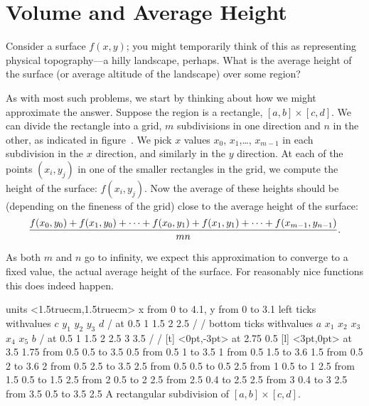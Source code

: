 \section{Volume and Average Height}{}{}

Consider a surface $f(x,y)$; you might temporarily think of this as
representing physical topography---a hilly landscape, perhaps. What is
the average height of the surface (or average
altitude of the landscape) over some region?

As with most such problems, we start by thinking about how we
might approximate the answer. Suppose the region is a rectangle,
$[a,b]\times[c,d]$. We can divide the rectangle into a grid, $m$
subdivisions in one direction and $n$ in the other, as indicated in
figure~. We pick $x$ values $x_0$,
$x_1$,\dots, $x_{m-1}$ in each subdivision in the $x$ direction, and
similarly in the $y$ direction.
At each of the points $(x_i,y_j)$ in one of the smaller rectangles in
the grid, we
compute the height of the surface: $f(x_i,y_j)$. Now the average
of these heights should be (depending on the fineness of the grid)
close to the average height of the surface:
$${f(x_0,y_0)+f(x_1,y_0)+\cdots+f(x_0,y_1)+f(x_1,y_1)+\cdots+
f(x_{m-1},y_{n-1})\over mn}.$$

As both $m$ and $n$ go to infinity, we expect this approximation to
converge to a fixed value, the actual average height of the
surface. For reasonably nice functions this does indeed happen.

\figure
\texonly
\vbox{\beginpicture
\normalgraphs
\ninepoint
\setcoordinatesystem units <1.5truecm,1.5truecm>
\setplotarea x from 0 to 4.1, y from 0 to 3.1
\axis left ticks withvalues $c$ $y_1$ $y_2$ $y_3$ $d$ / 
at 0.5 1 1.5 2 2.5 / /
\axis bottom ticks withvalues $a$ $x_1$ $x_2$ $x_3$ $x_4$ $x_5$ $b$ / 
at 0.5 1 1.5 2 2.5 3 3.5 / /
 [t] <0pt,-3pt> at 2.75 0.5
 [l] <3pt,0pt> at 3.5 1.75
\putrule from 0.5 0.5 to 3.5 0.5
\putrule from 0.5 1 to 3.5 1
\putrule from 0.5 1.5 to 3.6 1.5
\putrule from 0.5 2 to 3.6 2
\putrule from 0.5 2.5 to 3.5 2.5
\putrule from 0.5 0.5 to 0.5 2.5
\putrule from 1 0.5 to 1 2.5
\putrule from 1.5 0.5 to 1.5 2.5
\putrule from 2 0.5 to 2 2.5
\putrule from 2.5 0.4 to 2.5 2.5
\putrule from 3 0.4 to 3 2.5
\putrule from 3.5 0.5 to 3.5 2.5
\endpicture}
\endtexonly
{}
\begincaption
A rectangular subdivision of $[a,b]\times[c,d]$.
\endcaption
\endfigure

